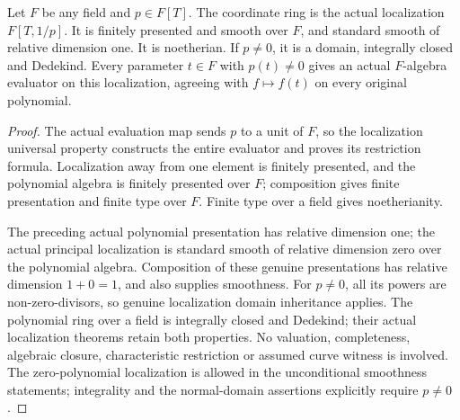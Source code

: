 \begin{theorem}
\label{algebra:principal-open-line-ring}
\leanok
{}
Let $F$ be any field and $p\in F[T]$. The coordinate ring is the actual
localization $F[T,1/p]$. It is finitely presented and smooth over $F$,
and standard smooth of relative dimension one. It is noetherian.
If $p\ne0$, it is a domain, integrally closed and Dedekind.
Every parameter $t\in F$ with $p(t)\ne0$ gives an actual $F$-algebra
evaluator on this localization, agreeing with $f\mapsto f(t)$ on every
original polynomial.
\end{theorem}
\begin{proof}
The actual evaluation map sends $p$ to a unit of $F$, so the localization
universal property constructs the entire evaluator and proves its
restriction formula. Localization away from one element is finitely
presented, and the polynomial algebra is finitely presented over $F$;
composition gives finite presentation and finite type over $F$.
Finite type over a field gives noetherianity.

The preceding actual polynomial presentation has relative dimension
one; the actual principal localization is standard smooth of relative
dimension zero over the polynomial algebra. Composition of these genuine
presentations has relative dimension $1+0=1$, and also supplies smoothness.
For $p\ne0$, all its powers are non-zero-divisors, so genuine localization
domain inheritance applies. The polynomial ring over a field is integrally
closed and Dedekind; their actual localization theorems retain both
properties. No valuation, completeness, algebraic closure, characteristic
restriction or assumed curve witness is involved. The zero-polynomial
localization is allowed in the unconditional smoothness statements;
integrality and the normal-domain assertions explicitly require $p\ne0$.
\end{proof}

